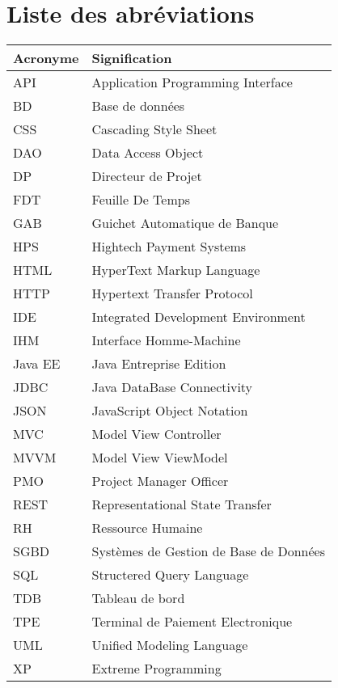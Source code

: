 \chapter*{Liste des abréviations}

\renewcommand{\arraystretch}{1.15}
\begin{table}[ht]
\begin{center}
\begin{tabular}{p{4cm}p{9cm}}
  \hline
Acronyme & Signification \\
  \hline
API & Application Programming Interface \\
BD & Base de données \\
CSS & Cascading Style Sheet \\
DAO & Data Access Object \\
DP & Directeur de Projet \\
FDT & Feuille De Temps \\
GAB & Guichet Automatique de Banque \\
HPS & Hightech Payment Systems \\
HTML & HyperText Markup Language \\
HTTP & Hypertext Transfer Protocol \\
IDE & Integrated Development Environment \\
IHM & Interface Homme-Machine\\
Java EE & Java Entreprise Edition \\
JDBC & Java DataBase Connectivity \\
JSON & JavaScript Object Notation \\
MVC & Model View Controller \\
MVVM & Model View ViewModel \\
PMO & Project Manager Officer \\
REST & Representational State Transfer \\
RH & Ressource Humaine \\
SGBD & Systèmes de Gestion de Base de Données \\
SQL & Structered Query Language \\
TDB & Tableau de bord \\
TPE & Terminal de Paiement Electronique \\
UML & Unified Modeling Language \\
XP & Extreme Programming \\
   \hline
\end{tabular}

\end{center}
\end{table}
\renewcommand{\arraystretch}{1}
